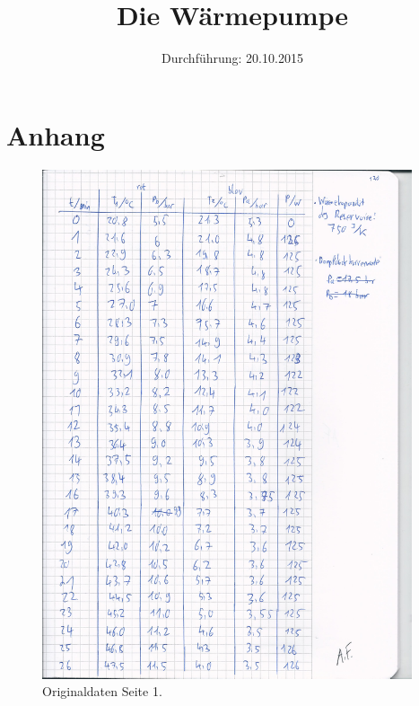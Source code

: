 

\subject{Versuchsprotokoll zum Versuch Nr. 206}
\title{Die Wärmepumpe}
\date{
  Durchführung: 20.10.2015
}



\maketitle
\newpage





\newpage
\section{Anhang}
\begin{figure}
  \centering
  \includegraphics[height=15.0cm]{original_v206_1.jpg}
  \caption{Originaldaten Seite 1.}
  \label{fig:o1}
\end{figure}

